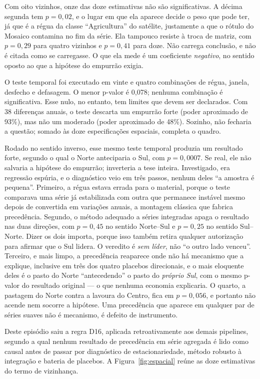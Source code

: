 Com oito vizinhos, onze das doze estimativas não são significativas. A décima
segunda tem $p = 0{,}02$, e o lugar em que ela aparece decide o peso que pode
ter, já que é a régua da classe ``Agricultura'' do satélite, justamente a que o
rótulo do Mosaico contamina no fim da série. Ela tampouco resiste à troca de
matriz, com $p = 0{,}29$ para quatro vizinhos e $p = 0{,}41$ para doze. Não
carrega conclusão, e não é citada como se carregasse. O que ela mede é um
coeficiente \emph{negativo}, no sentido oposto ao que a hipótese do empurrão
exigia.

O teste temporal foi executado em vinte e quatro combinações de régua, janela,
desfecho e defasagem. O menor p-valor é 0,078; nenhuma combinação é
significativa. Esse nulo, no entanto, tem limites que devem ser declarados.
Com 38 diferenças anuais, o teste descarta um empurrão forte (poder aproximado
de 93\%), mas não um moderado (poder aproximado de 48\%). Sozinho, não
fecharia a questão; somado às doze especificações espaciais, completa o
quadro.

Rodado no sentido inverso, esse mesmo teste temporal produzia um resultado
forte, segundo o qual o Norte anteciparia o Sul, com $p = 0{,}0007$. Se real,
ele não salvaria a hipótese do empurrão; inverteria a tese inteira.
Investigado, era regressão espúria, e o diagnóstico veio em três passos,
nenhum deles ``a amostra é pequena''. Primeiro, a régua estava errada para o
material, porque o teste comparava uma série já estabilizada com outra que permanece
instável mesmo depois de convertida em variações anuais, a montagem clássica
que fabrica precedência. Segundo, o método adequado a séries integradas apaga
o resultado nas duas direções, com $p = 0{,}45$ no sentido Norte--Sul e $p =
0{,}25$ no sentido Sul--Norte. Dizer os dois importa, porque isso também retira
qualquer autorização para afirmar que o Sul lidera. O veredito é \emph{sem
líder}, não ``o outro lado venceu''. Terceiro, e mais limpo, a precedência
reaparece onde não há mecanismo que a explique, inclusive em três dos quatro placebos
direcionais, e o mais eloquente deles é o pasto do Norte ``antecedendo'' o
pasto do \emph{próprio Sul}, com o mesmo p-valor do resultado original --- o
que nenhuma economia explicaria. O quarto, a pastagem do Norte contra a
lavoura do Centro, fica em $p = 0{,}056$, e portanto não acende nem socorre a
hipótese. Uma precedência que aparece em qualquer par de séries suaves não é
mecanismo, é defeito de instrumento.

Deste episódio saiu a regra D16, aplicada retroativamente aos demais
pipelines, segundo a qual nenhum resultado de precedência em série agregada é
lido como causal antes de passar por diagnóstico de estacionariedade, método
robusto à integração e bateria de placebos. A Figura~\ref{fig:espacial} reúne
as doze estimativas do termo de vizinhança.

